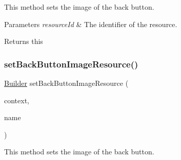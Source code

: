 This method sets the image of the back button. 


\begin{DoxyParams}{Parameters}
{\em resource\+Id} & The identifier of the resource. \\
\hline
\end{DoxyParams}
\begin{DoxyReturn}{Returns}
this 
\end{DoxyReturn}
\mbox{\label{classcom_1_1toast_1_1android_1_1gamebase_1_1_gamebase_web_view_configuration_1_1_builder_a1b1f92b0859afc2d7c1fb4b166f1f53b}} 
\subsubsection{\texorpdfstring{set\+Back\+Button\+Image\+Resource()}{setBackButtonImageResource()}\hspace{0.1cm}{\footnotesize\ttfamily [2/2]}}
{\footnotesize\ttfamily \hyperlink{classcom_1_1toast_1_1android_1_1gamebase_1_1_gamebase_web_view_configuration_1_1_builder}{Builder} set\+Back\+Button\+Image\+Resource (\begin{DoxyParamCaption}\item[{@Non\+Null final Context}]{context,  }\item[{@Non\+Null final String}]{name }\end{DoxyParamCaption})}



This method sets the image of the back button. 


